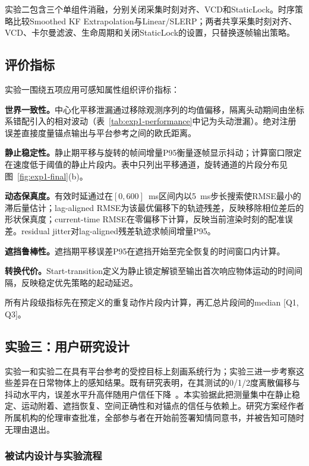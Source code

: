 \documentclass[review]{vgtc}
\begin{document}
实验二包含三个单组件消融，分别关闭采集时刻对齐、VCD和StaticLock。时序策略比较Smoothed KF Extrapolation与Linear/SLERP；两者共享采集时刻对齐、VCD、卡尔曼滤波、生命周期和关闭StaticLock的设置，只替换逐帧输出策略。

\subsection{评价指标}

实验一围绕五项应用可感知属性组织评价指标：

\textbf{世界一致性。}中心化平移泄漏通过移除观测序列的均值偏移，隔离头动期间由坐标系错配引入的相对波动（表~\ref{tab:exp1-performance}中记为头动泄漏）。绝对注册误差直接度量锚点输出与平台参考之间的欧氏距离。

\textbf{静止稳定性。}静止期平移与旋转的帧间增量P95衡量逐帧显示抖动；计算窗口限定在速度低于阈值的静止片段内。表中只列出平移通道，旋转通道的片段分布见图~\ref{fig:exp1-final}(b)。

\textbf{动态保真度。}有效时延通过在$[0, 600]$~ms区间内以5~ms步长搜索使RMSE最小的滞后量估计；lag-aligned RMSE为该最优偏移下的轨迹残差，反映移除相位差后的形状保真度；current-time RMSE在零偏移下计算，反映当前渲染时刻的配准误差。residual jitter对lag-aligned残差轨迹求帧间增量P95。

\textbf{遮挡鲁棒性。}遮挡期平移误差P95在遮挡开始至完全恢复的时间窗口内计算。

\textbf{转换代价。}Start-transition定义为静止锁定解锁至输出首次响应物体运动的时间间隔，反映稳定优先策略的起动延迟。

所有片段级指标先在预定义的重复动作片段内计算，再汇总片段间的median [Q1, Q3]。

\subsection{实验三：用户研究设计}\label{sec:exp3-design}

实验一和实验二在具有平台参考的受控目标上刻画系统行为；实验三进一步考察这些差异在日常物体上的感知结果。既有研究表明，在其测试的0/1/2度离散偏移与抖动水平内，误差水平升高伴随用户信任下降~\cite{gottsacker2024artrust}。本实验据此把测量集中在静止稳定、运动附着、遮挡恢复、空间正确性和对锚点的信任与依赖上。研究方案经作者所属机构的伦理审查批准，全部参与者在开始前签署知情同意书，并被告知可随时无理由退出。

\subsubsection{被试内设计与实验流程}
\end{document}
